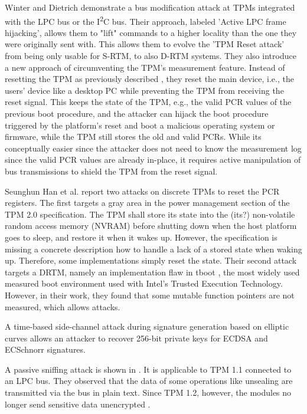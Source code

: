 Winter and Dietrich \cite{Winter2013} demonstrate a bus modification attack at TPMs integrated with the LPC bus or the I\textsuperscript{2}C bus.
Their approach, labeled 'Active LPC frame hijacking', allows them to "lift" commands to a higher locality than the one they were originally sent with. This allows them to evolve the 'TPM Reset attack' from being only usable for S-RTM, to also D-RTM systems.
They also introduce a new approach of circumventing the TPM's measurement feature. Instead of resetting the TPM as previously described \cite{kauerBernhard,sparks2007}, they reset the main device, i.e., the users' device like a desktop PC while preventing the TPM from receiving the reset signal. This keeps the state of the TPM, e.g., the valid \ac{PCR} values of the previous boot procedure, and the attacker can hijack the boot procedure triggered by the platform's reset and boot a malicious operating system or firmware, while the TPM still stores the old and valid PCRs. While its conceptually easier since the attacker does not need to know the measurement log since the valid \ac{PCR} values are already in-place, it requires active manipulation of bus transmissions to shield the TPM from the reset signal.

Seunghun Han et al. \cite{aBadDream} report two attacks on discrete TPMs to reset the PCR registers. The first targets a gray area in the power management section of the TPM 2.0 specification. The TPM shall store its state into the (its?) non-volatile random access memory (NVRAM) before shutting down when the host platform goes to sleep, and restore it when it wakes up. However, the specification is missing a concrete description how to handle a lack of a stored state when waking up. Therefore, some implementations simply reset the state. Their second attack targets a DRTM, namely an implementation flaw in tboot \cite{tboot}, the most widely used measured boot environment used with Intel's Trusted Execution Technology. However, in their work, they found that some mutable function pointers are not measured, which allows attacks.

A time-based side-channel attack \cite{Moghimi2019} during signature generation based on elliptic curves allows an attacker to recover 256-bit private keys for ECDSA and ECSchnorr signatures.

A passive sniffing attack is shown in \cite{Kursawe2005AnalyzingTP}. It is applicable to TPM 1.1 connected to an LPC bus. They observed that the data of some operations like unsealing are transmitted via the bus in plain text. Since TPM 1.2, however, the modules no longer send sensitive data unencrypted \cite{Winter2013}.

